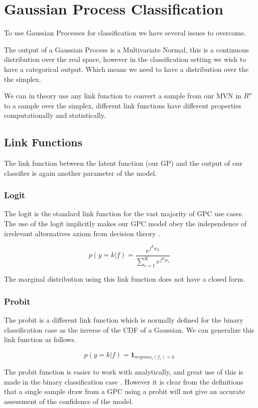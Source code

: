 \documentclass[12pt, a4paper]{report}
\theoremstyle{definition}
\theoremstyle{definition}
\theoremstyle{definition}
\begin{document}
\section{Gaussian Process Classification}

To use Gaussian Processes for classification we have several issues to overcome.

The output of a Gaussian Process is a Multivariate Normal, this is a continuous distribution over the real space, however in the classification setting we wish to have a categorical output. Which means we need to have a distribution over the the simplex.

We can in theory use any link function to convert a sample from our MVN in $R^n$ to a sample over the simplex, different link functions have different properties computationally and statistically.

\subsection{Link Functions}

The link function between the latent function (our GP) and the output of our classifier is again another parameter of the model.

\subsubsection{Logit}

The logit is the standard link function for the vast majority of GPC use cases. The use of the logit implicitly makes our GPC model obey the independence of irrelevant alternatives axiom from decision theory \cite{resnet}.


$$p\left( y = k | f\right) = \frac{e^{f^T w_k}}{\sum_{i=1}^{K} e^{f^T w_i}}$$


The marginal distribution using this link function does not have a closed form.


\subsubsection{Probit}

The probit is a different link function which is normally defined for the binary classification case as the inverse of the CDF of a Gaussian. We can generalize this link function as follows.

$$p\left(y = k | f\right) = \mathbf{1}_{argmax_i(f_i) = k}$$


The probit function is easier to work with analytically, and great use of this is made in the binary classification case \cite{houlsby2011bayesian}. However it is clear from the definitions that a single sample draw from a GPC using a probit will not give an accurate assessment of the confidence of the model.
\end{document}
